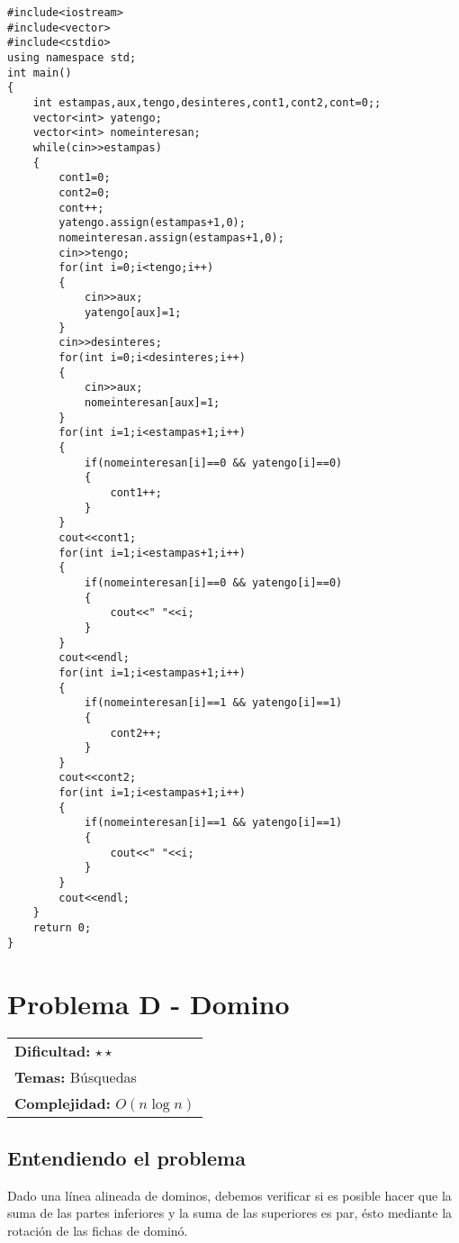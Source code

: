 \begin{verbatim}
#include<iostream>
#include<vector>
#include<cstdio>
using namespace std;
int main()
{
    int estampas,aux,tengo,desinteres,cont1,cont2,cont=0;;
    vector<int> yatengo;
    vector<int> nomeinteresan;
    while(cin>>estampas)
    {
        cont1=0;
        cont2=0;
        cont++;
        yatengo.assign(estampas+1,0);
        nomeinteresan.assign(estampas+1,0);
        cin>>tengo;
        for(int i=0;i<tengo;i++)
        {
            cin>>aux;
            yatengo[aux]=1;
        }
        cin>>desinteres;
        for(int i=0;i<desinteres;i++)
        {
            cin>>aux;
            nomeinteresan[aux]=1;
        }
        for(int i=1;i<estampas+1;i++)
        {
            if(nomeinteresan[i]==0 && yatengo[i]==0)
            {
                cont1++;
            }
        }
        cout<<cont1;
        for(int i=1;i<estampas+1;i++)
        {
            if(nomeinteresan[i]==0 && yatengo[i]==0)
            {
                cout<<" "<<i;
            }
        }
        cout<<endl;
        for(int i=1;i<estampas+1;i++)
        {
            if(nomeinteresan[i]==1 && yatengo[i]==1)
            {
                cont2++;
            }
        }
        cout<<cont2;
        for(int i=1;i<estampas+1;i++)
        {
            if(nomeinteresan[i]==1 && yatengo[i]==1)
            {
                cout<<" "<<i;
            }
        }
        cout<<endl;
    }
    return 0;
}
\end{verbatim}



\section{Problema D - Domino}

\hfill
\begin{tabular}{@{}l@{}}
\textbf{Dificultad:} $\star\star$ \\
\textbf{Temas:} Búsquedas \\
\textbf{Complejidad:} $O(n \log n)$
\end{tabular}

\subsection*{Entendiendo el problema}
Dado una línea alineada de dominos, debemos verificar si es posible hacer que la suma de las partes inferiores y la suma de las superiores es par, ésto mediante la rotación de las fichas de dominó.
